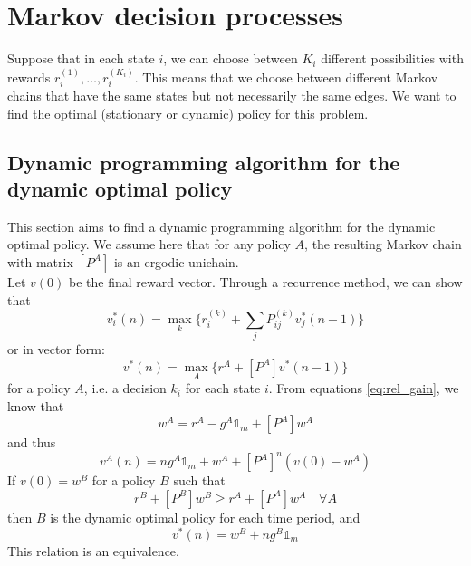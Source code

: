 \documentclass[12pt, openany]{report}
\theoremstyle{definition}
\begin{document}
\section{Markov decision processes}
Suppose that in each state $i$, we can choose between $K_i$ different possibilities with rewards $r_i^{(1)},\dots,r_i^{(K_i)}$. This means that we choose between different Markov chains that have the same states but not necessarily the same edges. We want to find the optimal (stationary or dynamic) policy for this problem. 
\subsection{Dynamic programming algorithm for the dynamic optimal policy}
This section aims to find a dynamic programming algorithm for the dynamic optimal policy. We assume here that for any policy $A$, the resulting Markov chain with matrix $[P^A]$ is an ergodic unichain.\\

Let $v(0)$ be the final reward vector. Through a recurrence method, we can show that 
\begin{equation}
	v_i^*(n) = \max_k \{r_i^{(k)}+\sum_j P_{ij}^{(k)}v_j^*(n-1)\}
\end{equation}
or in vector form:
\begin{equation}
	v^*(n) = \max_A \{r^A + [P^A]v^*(n-1)\}
\end{equation}
for a policy $A$, i.e. a decision $k_i$ for each state $i$. From equations \eqref{eq:rel_gain}, we know that 
\begin{equation}
	w^A = r^A - g^A\mathbb{1}_m + [P^A]w^A
\end{equation}
and thus 
\begin{equation}
	v^A(n) = ng^A\mathbb{1}_m + w^A + [P^A]^n (v(0)-w^A)
\end{equation}
If $v(0)=w^B$ for a policy $B$ such that 
\begin{equation}
	r^B + [P^B]w^B \ge r^A +[P^A]w^A \quad \forall A
\end{equation}
then $B$ is the dynamic optimal policy for each time period, and 
\begin{equation}
	v^*(n) = w^B + ng^B\mathbb{1}_m
\end{equation}
This relation is an equivalence. 
\end{document}
